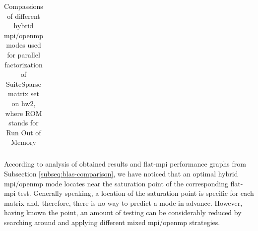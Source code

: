 \begin{table}[h!]
\begin{tabular}{|c|c|c|c|c|c|c|}
\end{tabular}
\caption[Compassions of different hybrid \acrshort{mpi}/\acrshort{openmp} modes used for parallel factorization of SuiteSparse matrix set on \gls{hw2}\\]{Compassions of different hybrid \acrshort{mpi}/\acrshort{openmp} modes used for parallel factorization of SuiteSparse matrix set on \gls{hw2}, where ROM stands for Run Out of Memory}
\label{fig:mpi-omp-suitesparse-hw2}
\end{table}





According to analysis of obtained results and flat-\acrshort{mpi} performance graphs from Subsection \ref{subseq:blas-comparison}, we have noticed that an optimal hybrid \acrshort{mpi}/\acrshort{openmp} mode locates near the saturation point of the corresponding flat-\acrshort{mpi} test. Generally speaking, a location of the saturation point is specific for each matrix and, therefore, there is no way to predict a mode in advance. However, having known the point, an amount of testing can be considerably reduced by searching around and applying different mixed \acrshort{mpi}/\acrshort{openmp} strategies.\\



